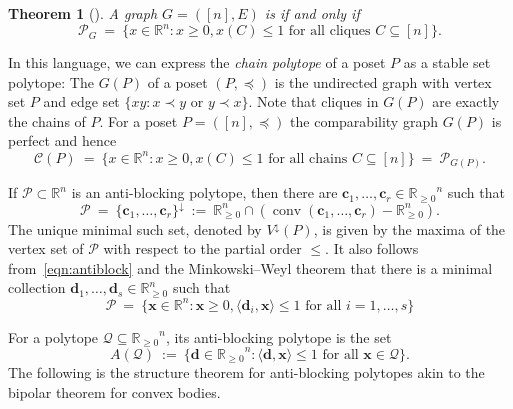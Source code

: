 \documentclass[11pt]{amsart}
\newtheorem{thm}{Theorem}[section]
\theoremstyle{definition}
\begin{document}
\begin{thm}[{\cite{Lovasz}}]\label{thm:perfect}
    A graph $G = ([n],E)$ is {\textbf{\color{black}{perfect}}} if and only if
    \[
        {\mathcal{P}}_G \ = \ \{ x \in {\mathbb{R}}^n : x \ge 0, x(C) \le 1 \text{ for all cliques
        } C \subseteq [n] \}.
    \]
\end{thm}

In this language, we can express the \emph{chain polytope} of a poset ${P}$ as
a stable set polytope: The {\textbf{\color{black}{comparability graph}}} $G({P})$ of a poset
$({P},\preceq)$ is the undirected graph with vertex set ${P}$ and edge set $\{
xy : x \prec y \text{ or } y \prec x \}$. Note that cliques in $G({P})$ are
exactly the chains of ${P}$. For a poset ${P} = ([n],\preceq)$ the comparability graph $G({P})$ is perfect and hence
\[
    {\mathcal{C}({P})} \ = \ \{ x \in {\mathbb{R}}^n : x \ge 0, x(C) \le 1 \text{ for all
    chains } C \subseteq [n] \} \ = \ {\mathcal{P}}_{G({P})}.
\]

If ${\mathcal{P}} \subset {\mathbb{R}}^n$ is an anti-blocking polytope, then there are 
${\mathbf{c}}_1,\dots,{\mathbf{c}}_r \in {{\mathbb{R}}_{\ge0}}^n$ such that
\begin{equation}\label{eqn:downhull}
    {\mathcal{P}} \ = \ {\{{{\mathbf{c}}_1,\dots,{\mathbf{c}}_r}\}^{\downarrow}} \ := \ {\mathbb{R}}^n_{\ge 0} \cap (
    \operatorname{conv}({\mathbf{c}}_1,\dots,{\mathbf{c}}_r) - {\mathbb{R}}^n_{\ge 0}).
\end{equation}
The unique minimal such set, denoted by ${V^\downarrow}(P)$, is given by the maxima of
the vertex set of ${\mathcal{P}}$ with respect to the partial order $\le$.  It also
follows from~\eqref{eqn:antiblock} and the Minkowski--Weyl theorem that there
is a minimal collection ${\mathbf{d}}_1,\dots,{\mathbf{d}}_s \in {\mathbb{R}}^n_{\ge 0}$ such that 
\[
    {\mathcal{P}} \ = \ \{ {\mathbf{x}} \in {\mathbb{R}}^n : {\mathbf{x}} \ge 0, {\langle{{{\mathbf{d}}_i,{\mathbf{x}}}}\rangle} \le 1 \text{ for all }
    i=1,\dots,s\}
\]

For a polytope ${\mathcal{Q}} \subseteq {{\mathbb{R}}_{\ge0}}^n$, its {\textbf{\color{black}{associated}}} anti-blocking
polytope is the set
\[
    {A({{\mathcal{Q}}})} \ := \ \{ {\mathbf{d}} \in {{\mathbb{R}}_{\ge0}}^n : {\langle{{{\mathbf{d}},{\mathbf{x}}}}\rangle} \le 1 \text{ for all } {\mathbf{x}}
    \in {\mathcal{Q}} \}.
\]
The following is the structure theorem for anti-blocking polytopes akin to the
bipolar theorem for convex bodies.
\end{document}
